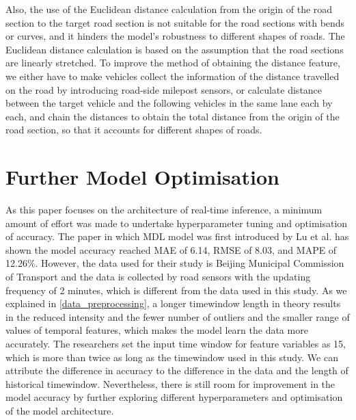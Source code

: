 \documentclass[11pt]{uonthesis}
\begin{document}
Also, the use of the Euclidean distance calculation from the origin of the road section to the target road section is not suitable for the road sections with bends or curves, and it hinders the model's robustness to different shapes of roads. The Euclidean distance calculation is based on the assumption that the road sections are linearly stretched. To improve the method of obtaining the distance feature, we either have to make vehicles collect the information of the distance travelled on the road by introducing road-side milepost sensors, or calculate distance between the target vehicle and the following vehicles in the same lane each by each, and chain the distances to obtain the total distance from the origin of the road section, so that it accounts for different shapes of roads.

\section{Further Model Optimisation}

As this paper focuses on the architecture of real-time inference, a minimum amount of effort was made to undertake hyperparameter tuning and optimisation of accuracy. The paper in which MDL model was first introduced by Lu et al. \cite{9284587} has shown the model accuracy reached MAE of 6.14, RMSE of 8.03, and MAPE of 12.26\%. However, the data used for their study is Beijing Municipal Commission of Transport and the data is collected by road sensors with the updating frequency of 2 minutes, which is different from the data used in this study. As we explained in \ref{data_preprocessing}, a longer timewindow length in theory results in the reduced intensity and the fewer number of outliers and the smaller range of values of temporal features, which makes the model learn the data more accurately. The researchers set the input time window for feature variables as 15, which is more than twice as long as the timewindow used in this study. We can attribute the difference in accuracy to the difference in the data and the length of historical timewindow. Nevertheless, there is still room for improvement in the model accuracy by further exploring different hyperparameters and optimisation of the model architecture.
\end{document}
